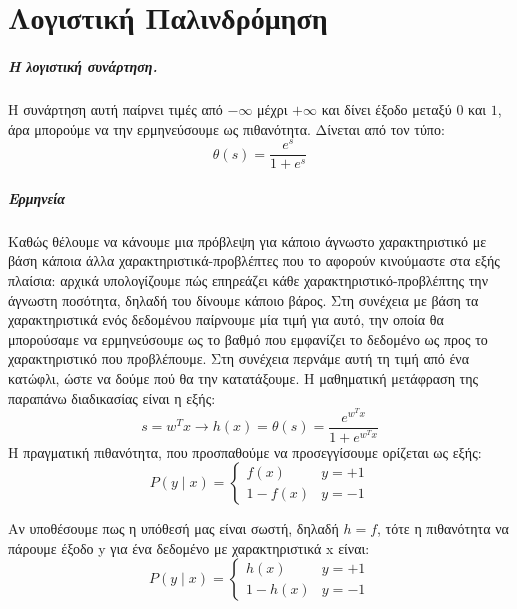 \chapter{Λογιστική Παλινδρόμηση}
\label{appendix:LReg}
\paragraph{Η λογιστική συνάρτηση.} Η συνάρτηση αυτή παίρνει τιμές από $- \infty$ μέχρι $+ \infty$ και δίνει έξοδο μεταξύ $0$ και $1$, άρα μπορούμε να την ερμηνεύσουμε ως πιθανότητα. Δίνεται από τον τύπο:
\begin{equation}
\theta(s)=\frac{e^s}{1 + e^s}
\end{equation}


\paragraph{Ερμηνεία} Καθώς θέλουμε να κάνουμε μια πρόβλεψη για κάποιο άγνωστο χαρακτηριστικό με βάση κάποια άλλα χαρακτηριστικά-προβλέπτες που το αφορούν κινούμαστε στα εξής πλαίσια: αρχικά υπολογίζουμε πώς επηρεάζει κάθε χαρακτηριστικό-προβλέπτης την άγνωστη ποσότητα, δηλαδή του δίνουμε κάποιο βάρος. Στη συνέχεια με βάση τα χαρακτηριστικά ενός δεδομένου παίρνουμε μία τιμή
για αυτό, την οποία θα μπορούσαμε να ερμηνεύσουμε ως το βαθμό που εμφανίζει το δεδομένο ως προς το χαρακτηριστικό που προβλέπουμε. Στη συνέχεια περνάμε αυτή τη τιμή  από ένα κατώφλι, ώστε να δούμε πού θα την κατατάξουμε. Η μαθηματική μετάφραση της παραπάνω διαδικασίας είναι η εξής:
\begin{equation}
s=w^T x \rightarrow h(x)=\theta(s)=\frac{e^{w^T x}}{1 + e^{w^T x} }\end{equation}
Η πραγματική πιθανότητα, που προσπαθούμε να προσεγγίσουμε  ορίζεται ως εξής:
\begin{equation}
P(y \mid x)=\left\{
\begin{array}{ll}
f(x)  &  y = +1 \\
1 - f(x)  &  y = -1
\end{array}
\right.
\end{equation}

Αν υποθέσουμε πως η υπόθεσή μας είναι σωστή, δηλαδή $h=f$, τότε η πιθανότητα να πάρουμε έξοδο y για ένα δεδομένο με χαρακτηριστικά x είναι:
\begin{equation}
P(y \mid x)=\left\{
\begin{array}{ll}
h(x)  &  y = +1 \\
1 - h(x)  &  y = -1
\end{array}
\right.
\end{equation}

